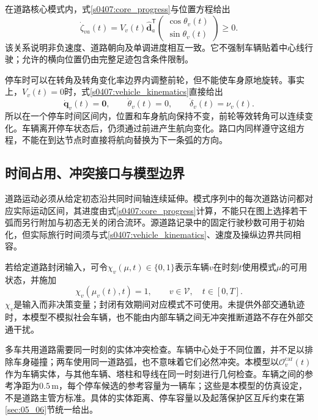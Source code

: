 在道路核心模式内，式\eqref{s0407:core_progress}与位置方程给出
\begin{equation}
 \dot\zeta_{va}(t)
 =V_v(t)\widehat{\mathbf d}_a^{\mathsf T}
       \begin{pmatrix}\cos\theta_v(t)\\\sin\theta_v(t)\end{pmatrix}
 \ge0.
 \label{s0407:progress_rate_relation}
\end{equation}
该关系说明非负速度、道路朝向及单调进度相互一致。它不强制车辆贴着中心线行驶；允许的横向位置仍由完整足迹包含条件限制。

停车时可以在转角及转角变化率边界内调整前轮，但不能使车身原地旋转。事实上，$V_v(t)=0$时，式\eqref{s0407:vehicle_kinematics}直接给出
\begin{equation}
 \dot{\mathbf q}_v(t)=\mathbf0,\qquad
 \dot\theta_v(t)=0,\qquad
 \dot\delta_v(t)=\nu_v(t).
 \label{s0407:stationary_steering}
\end{equation}
所以在一个停车时间区间内，位置和车身航向保持不变，前轮等效转角可以连续变化。车辆离开停车状态后，仍须通过前进产生航向变化。路口内同样遵守这组方程，不能在到达节点时直接将航向替换为下一条弧的方向。

\subsection{时间占用、冲突接口与模型边界}

道路运动必须从给定初态沿共同时间轴连续延伸。模式序列中的每次道路访问都对应实际运动区间，其进度由式\eqref{s0407:core_progress}计算，不能只在图上选择若干弧而另行附加与初态无关的闭合流环。源道路记录中的固定行驶秒数可用于初始化，但实际旅行时间须与式\eqref{s0407:vehicle_kinematics}、速度及操纵边界共同相容。

若给定道路封闭输入，可令$\chi_v(\mu,t)\in\{0,1\}$表示车辆$v$在时刻$t$使用模式$\mu$的可用状态，并施加
\begin{equation}
 \chi_v(\mu_v(t),t)=1,
 \qquad v\in\mathcal V,\quad t\in[0,T].
 \label{s0407:time_dependent_access}
\end{equation}
$\chi_v$是输入而非决策变量；封闭有效期间对应模式不可使用。未提供外部交通轨迹时，本模型不模拟社会车辆，也不能由内部车辆之间无冲突推断道路不存在外部交通干扰。

多车共用道路需要同一时刻的实体冲突检查。车辆中心处于不同位置，并不足以排除车身碰撞；两车使用同一道路弧，也不意味着它们必然冲突。本模型以$\mathcal O_v^{\mathrm{car}}(t)$作为车辆实体，与其他车辆、塔柱和导线在同一时刻进行几何检查。车辆之间的参考净距为$0.5\,\mathrm m$，每个停车候选的参考容量为一辆车；这些是本模型的仿真设定，不是道路主管方标准。具体的实体距离、停车容量以及起落保护区互斥约束在第\ref{sec:05_06}节统一给出。

